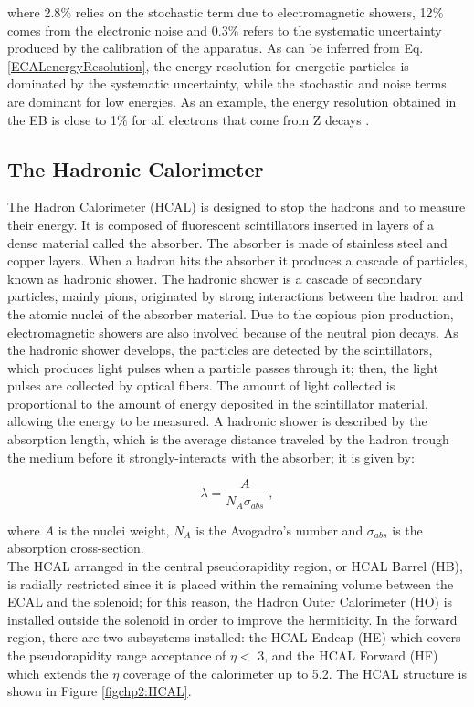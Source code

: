 \noindent where 2.8$\%$ relies on the stochastic term due to electromagnetic showers, 12$\%$ comes from the 
electronic noise and 0.3$\%$ refers to the systematic uncertainty produced by the calibration of the apparatus. As can be inferred from
Eq. \ref{ECALenergyResolution}, the energy resolution for energetic particles is dominated by the systematic uncertainty, while
the stochastic and noise terms are dominant for low energies. As an example, the energy resolution 
obtained in the EB is close to 1$\%$ for all electrons that come from Z decays \cite{ECALperformance}.

\subsection{The Hadronic Calorimeter}
\label{subsec:HCal}

\noindent The Hadron Calorimeter (HCAL) is designed to stop the hadrons and to measure 
their energy. It is composed of fluorescent scintillators inserted in layers of 
a dense material called the absorber. The absorber is made of stainless 
steel and copper layers. When a hadron hits the absorber it produces a cascade of 
particles, known as hadronic shower. The hadronic shower is a cascade of 
secondary particles, mainly pions, originated by strong interactions between 
the hadron and the atomic nuclei of the absorber material.  Due to the copious pion
production, electromagnetic showers are also involved because of the 
neutral pion decays. As the hadronic shower develops, the particles are detected by the scintillators, which
 produces light pulses when a particle passes through it; then, the light pulses are 
 collected by optical fibers. The amount of light collected is proportional to the amount 
 of energy deposited in the scintillator material, allowing the energy to be measured. A hadronic 
 shower is described by the absorption length, which is the average distance traveled by the 
 hadron trough the medium before it strongly-interacts with the absorber; it is given by:

 \begin{equation}
 \lambda = \frac{A}{N_{A} \sigma_{abs}}  \;,
\end{equation}

\noindent where $A$ is the nuclei weight, $N_{A}$ is the Avogadro's number and $\sigma_{abs}$
is the absorption cross-section.\\

\noindent The HCAL arranged in the central pseudorapidity region, or 
HCAL Barrel (HB), is radially restricted since it is placed within the remaining volume
between the ECAL and the solenoid; for this reason, the Hadron Outer Calorimeter (HO) is 
installed outside the solenoid in order to improve the hermiticity. In the 
forward region, there are two subsystems installed: the HCAL Endcap (HE) 
which covers the pseudorapidity range acceptance of $\eta <$ 3, and the HCAL 
Forward (HF) which extends the $\eta$ coverage of the calorimeter up to 5.2. The HCAL structure 
is shown in Figure \ref{figchp2:HCAL}.

